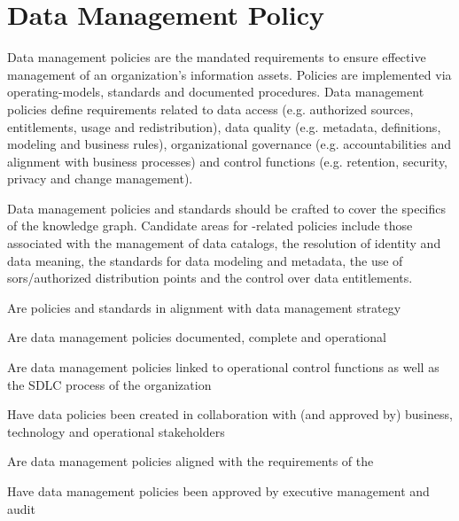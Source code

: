 \section{Data Management Policy}\label{sec:ekgmm-b-4-2} %

Data management policies are the mandated requirements to ensure effective management of an organization’s
information assets.
Policies are implemented via \glspl{operating-model}, standards and documented procedures.
Data management policies define requirements related to data access (e.g. authorized sources, entitlements,
usage and redistribution), data quality (e.g. metadata, definitions, modeling and business rules),
organizational governance (e.g. accountabilities and alignment with business processes) and
control functions (e.g. retention, security, privacy and change management).

\ekgmmContextSection

Data management policies and standards should be crafted to cover the specifics of the knowledge graph.
Candidate areas for -related policies include those associated with the management of data catalogs,
the resolution of identity and data meaning, the standards for data modeling and metadata,
the use of \glspl{sor}/authorized distribution points and the control over data entitlements.

\kgmmcorequestionssection

\begin{core-questions}

  \item [\thesection.1] Are policies and standards in alignment with data management strategy
  \item [\thesection.2] Are data management policies documented, complete and operational
  \item [\thesection.3] Are data management policies linked to operational control functions as well as the
                        SDLC process of the organization
  \item [\thesection.4] Have data policies been created in collaboration with (and approved by) business, technology
                        and operational stakeholders
  \item [\thesection.5] Are data management policies aligned with the requirements of the 
  \item [\thesection.6] Have data management policies been approved by executive management and audit

\end{core-questions}

